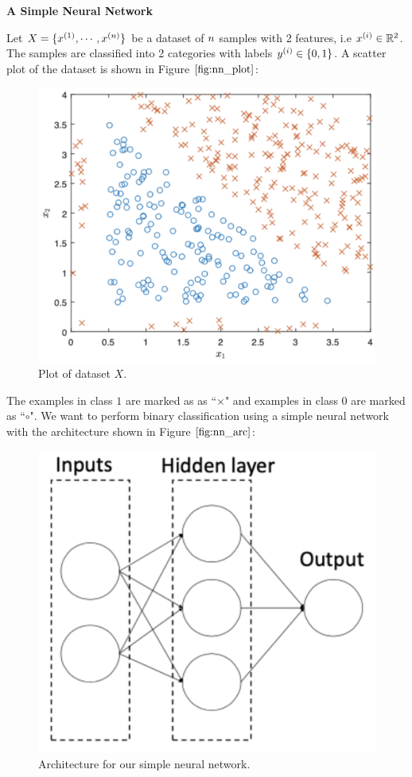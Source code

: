 \item {} {\bf A Simple Neural Network}

Let $X = \{x^{(1)}, \cdots, x^{({n})}\}$ be a dataset of ${n}$ samples with 2 features, i.e $x^{(i)} \in \mathbb{R}^2$. The samples are classified into 2 categories with labels $y^{(i)} \in \{0, 1\}$. A scatter plot of the dataset is shown in Figure $\ref{fig:nn_plot}$:
\begin{figure}[htbp]
    \centering
    \includegraphics[scale=0.3]{simple_nn/nn_plot.png}
    \caption{Plot of dataset $X$.}
    \label{fig:nn_plot}
\end{figure}

The examples in class $1$ are marked as as ``$\times$" and examples in class $0$ are marked as ``$\circ$". We want to perform binary classification using a simple neural network with the architecture shown in Figure $\ref{fig:nn_arc}$:
\begin{figure}[htbp]
    \centering
    \includegraphics[scale=0.3, clip]{simple_nn/nn_architecture.png}
    \caption{Architecture for our simple neural network.}
     \label{fig:nn_arc}
\end{figure}

